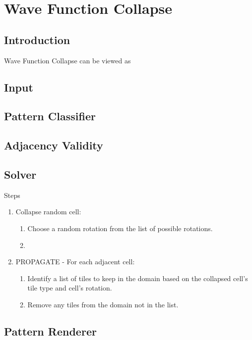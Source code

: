 \chapter{Wave Function Collapse}
\section{Introduction}
Wave Function Collapse can be viewed as
\section{Input}
\section{Pattern Classifier}
\section{Adjacency Validity}
\section{Solver}
Steps
\begin{enumerate}
    \item Collapse random cell:
    \begin{enumerate}
        \item Choose a random rotation from the list of possible rotations.
        \item 
    \end{enumerate}
    \item PROPAGATE - For each adjacent cell:
    \begin{enumerate}
        \item Identify a list of tiles to keep in the domain based on the collapsed cell's tile type and cell's rotation.
        \item Remove any tiles from the domain not in the list.
    \end{enumerate}
\end{enumerate}

\section{Pattern Renderer}